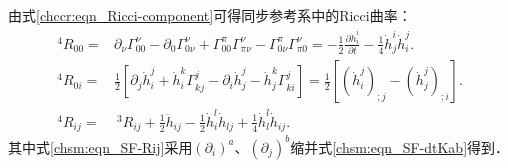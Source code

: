由式\eqref{chccr:eqn_Ricci-component}可得同步参考系中的Ricci曲率：
\begin{subequations}
\begin{align}
	{}^{4}R_{00} =& \partial_\nu \Gamma_{00}^{\nu} -\partial_0 \Gamma_{0\nu}^{\nu}
	+ \Gamma_{00}^{\pi} \Gamma_{\pi\nu}^{\nu} - \Gamma_{0\nu}^{\pi} \Gamma_{\pi 0}^{\nu} 
	=  -\frac{1}{2} \frac{\partial \dot{h}_i^i }{\partial t}   
	-\frac{1}{4} \dot{h}_j^i \dot{h}^j_i.  \label{chsm:eqn_SF-R00} \\
	{}^{4}R_{0i} 
	=&\frac{1}{2}\left[\partial_j \dot{h}^j_i + \dot{h}^k_i \Gamma_{kj}^{j} 
	-\partial_i \dot{h}^j_j - \dot{h}^k_j \Gamma_{ki}^{j} \right]
	=\frac{1}{2}\left[\left(\dot{h}^j_i\right)_{;j} - \left(\dot{h}^j_j\right)_{;i}\right].
	\label{chsm:eqn_SF-R0i} \\
	{}^4 R_{ij}= &\ {}^3 R_{ij} +\frac{1}{2}\ddot{h}_{ij} 
	- \frac{1}{2} \dot{h}_{i}^{l} \dot{h}_{lj} 
	+ \frac{1}{4} \dot{h}_{l}^l  \dot{h}_{ij}  . \label{chsm:eqn_SF-Rij}
\end{align}
\end{subequations}
其中式\eqref{chsm:eqn_SF-Rij}采用$(\partial_i)^a$、$(\partial_j)^b$缩并式\eqref{chsm:eqn_SF-dtKab}得到．






